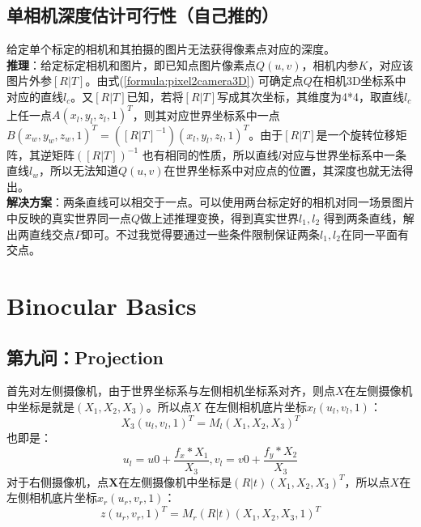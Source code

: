 \documentclass[UTF8]{ctexart}
\begin{document}
\subsection{单相机深度估计可行性（自己推的）}
给定单个标定的相机和其拍摄的图片无法获得像素点对应的深度。\\
\textbf{推理}：给定标定相机和图片，即已知点图片像素点$Q(u,v)$，相机内参$K$，对应该图片外参$[R|T]$。由式(\ref{formula:pixel2camera3D}) 可确定点$Q$在相机3D坐标系中对应的直线$l_c$。又$[R|T]$已知，若将$[R|T]$写成其次坐标，其维度为4*4，取直线$l_c$上任一点$A(x_l,y_l,z_l,1)^T$，则其对应世界坐标系中一点$B(x_w,y_w,z_w,1)^T=([R|T]^{-1})(x_l,y_l,z_l,1)^T$。由于$[R|T]$是一个旋转位移矩阵，其逆矩阵$([R|T])^{-1}$ 也有相同的性质，所以直线$l$对应与世界坐标系中一条直线$l_w$，所以无法知道$Q(u,v)$在世界坐标系中对应点的位置，其深度也就无法得出。\\
\textbf{解决方案}：两条直线可以相交于一点。可以使用两台标定好的相机对同一场景图片中反映的真实世界同一点$Q$做上述推理变换，得到真实世界$l_1,l_2$ 得到两条直线，解出两直线交点$P$即可。不过我觉得要通过一些条件限制保证两条$l_1,l_2$在同一平面有交点。
\section{Binocular Basics}
\subsection{第九问：Projection}
首先对左侧摄像机，由于世界坐标系与左侧相机坐标系对齐，则点$X$在左侧摄像机中坐标是就是$(X_1,X_2,X_3)$。所以点$X$ 在左侧相机底片坐标$x_l(u_l,v_l,1)$：
$$X_3(u_l, v_l, 1)^T=M_l(X_1,X_2,X_3)^T $$
也即是：
$$u_l=u0+\frac{f_x*X_1}{X_3},v_l=v0+\frac{f_y*X_2}{X_3}$$
对于右侧摄像机，点$\textbf{X}$在左侧摄像机中坐标是$(R|t)(X_1,X_2,X_3)^T$，所以点$X$在左侧相机底片坐标$x_r(u_r,v_r,1)$：
$$z(u_r, v_r, 1)^T=M_r(R|t)(X_1,X_2,X_3,1)^T $$
\end{document}
